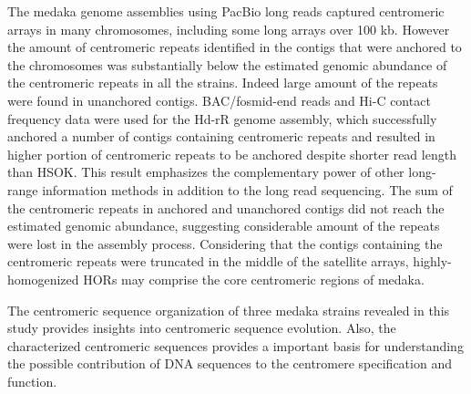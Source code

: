 The medaka genome assemblies using PacBio long reads captured centromeric arrays in many chromosomes, including some long arrays over 100 kb. However the amount of centromeric repeats identified in the contigs that were anchored to the chromosomes was substantially below the estimated genomic abundance of the centromeric repeats in all the strains. Indeed large amount of the repeats were found in unanchored contigs. BAC/fosmid-end reads and Hi-C contact frequency data were used for the Hd-rR genome assembly, which successfully anchored a number of contigs containing centromeric repeats and resulted in higher portion of centromeric repeats to be anchored despite shorter read length than HSOK. This result emphasizes the complementary power of other long-range information methods in addition to the long read sequencing. The sum of the centromeric repeats in anchored and unanchored contigs did not reach the estimated genomic abundance, suggesting considerable amount of the repeats were lost in the assembly process. Considering that the contigs containing the centromeric repeats were truncated in the middle of the satellite arrays, highly-homogenized HORs may comprise the core centromeric regions of medaka.

The centromeric sequence organization of three medaka strains revealed in this study provides insights into centromeric sequence evolution. Also, the characterized centromeric sequences provides a important basis for understanding the possible contribution of DNA sequences to the centromere specification and function.

\

\

\

\

\
